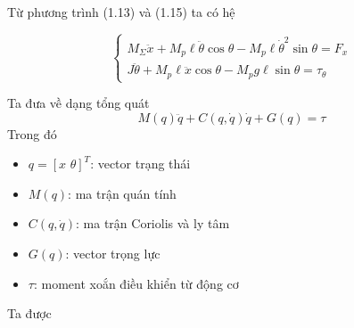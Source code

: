             Từ phương trình (1.13) và (1.15) ta có hệ 

            \begin{equation}
                \begin{cases}
                    M_{\Sigma} \ddot{x} + M_p \ell \ddot{\theta} \cos \theta - M_p \ell \dot{\theta}^2 \sin \theta = F_x \\
                    J \ddot{\theta} + M_p \ell \ddot{x} \cos \theta - M_p g \ell \sin \theta = \tau_\theta
                \end{cases}
            \end{equation}

            Ta đưa về dạng tổng quát
            \begin{equation}
                M(q) \ddot{q} + C (q, \dot{q}) \dot{q} + G(q) = \tau
            \end{equation}
            Trong đó
            \begin{itemize}
                \item $q = [x \,\, \theta]^T$: vector trạng thái
                \item $M(q)$: ma trận quán tính
                \item $C(q, \dot{q})$: ma trận Coriolis và ly tâm
                \item $G(q)$: vector trọng lực
                \item $\tau$: moment xoắn điều khiển từ động cơ
            \end{itemize} 
            Ta được
